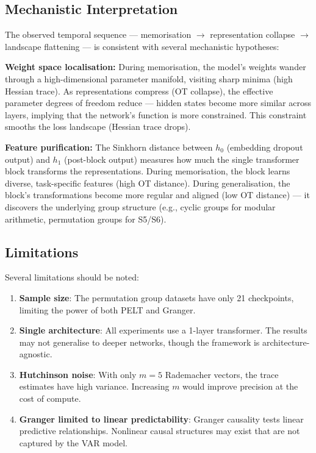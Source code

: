 \documentclass[12pt,twoside]{article}
\begin{document}
\subsection{Mechanistic Interpretation}

The observed temporal sequence --- memorisation $\to$ representation collapse
$\to$ landscape flattening --- is consistent with several mechanistic
hypotheses:

\textbf{Weight space localisation:}
During memorisation, the model's weights wander through a high-dimensional
parameter manifold, visiting sharp minima (high Hessian trace). As
representations compress (OT collapse), the effective parameter degrees of
freedom reduce --- hidden states become more similar across layers, implying
that the network's function is more constrained. This constraint smooths the
loss landscape (Hessian trace drops).

\textbf{Feature purification:}
The Sinkhorn distance between $h_0$ (embedding dropout output) and $h_1$
(post-block output) measures how much the single transformer block transforms
the representations. During memorisation, the block learns diverse,
task-specific features (high OT distance). During generalisation, the block's
transformations become more regular and aligned (low OT distance) --- it
discovers the underlying group structure (e.g., cyclic groups for modular
arithmetic, permutation groups for S5/S6).

\subsection{Limitations}

Several limitations should be noted:

\begin{enumerate}
  \item \textbf{Sample size}: The permutation group datasets have only 21
    checkpoints, limiting the power of both PELT and Granger.
  \item \textbf{Single architecture}: All experiments use a 1-layer
    transformer. The results may not generalise to deeper networks, though
    the framework is architecture-agnostic.
  \item \textbf{Hutchinson noise}: With only $m=5$ Rademacher vectors, the
    trace estimates have high variance. Increasing $m$ would improve
    precision at the cost of compute.
  \item \textbf{Granger limited to linear predictability}: Granger causality
    tests linear predictive relationships. Nonlinear causal structures may
    exist that are not captured by the VAR model.
\end{enumerate}
\end{document}
